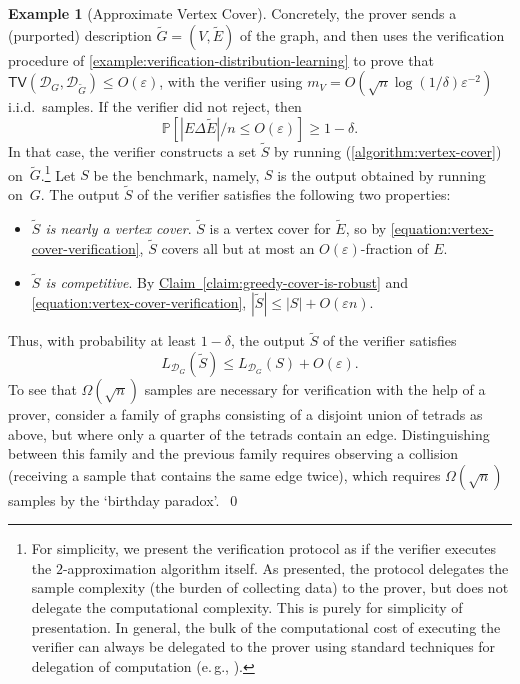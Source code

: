 \documentclass[11pt]{article}
\numberwithin{equation}{section}
\theoremstyle{definition}
\newtheorem{example}[theorem]{Example}
\theoremstyle{plain}
\newcommand{\eg}{e.\,g.}
\newcommand{\expref}[2]{\hyperref[#2]{#1~\ref{#2}}}
\theoremstyle{definition}\newtheorem{notation}[theorem]{Notation}\theoremstyle{plain}\raggedbottom
\newcommand{\roundBrackets}[1]{
	\mathopen{}\left(#1\right)\mathclose{}
}
\newcommand{\squareBrackets}[1]{
	\mathopen{}\left[#1\right]\mathclose{}
}
\newcommand{\customFunctionRound}[2]{
	#1\roundBrackets{#2}
}
\newcommand{\customFunctionSquare}[2]{
	#1\squareBrackets{#2}
}
\newcommand{\sfFunction}[2]{
	\customFunctionRound{\mathsf{#1}}{#2}
}
\newcommand{\bbFunction}[2]{
	\customFunctionSquare{\mathbb{#1}}{#2}
}
\newcommand{\OmegaOf}[1]{\Omega\roundBrackets{#1}}
\newcommand{\BigO}[1]{O\roundBrackets{#1}}
\newcommand{\PP}[1]{\bbFunction{P}{#1}}
\newcommand{\Loss}[2]{\LossNameEmpty_{#1}\roundBrackets{#2}}
\newcommand{\LossNameEmpty}{L}
\newcommand{\TV}[1]{\sfFunction{TV}{#1}}
\newcommand{\cD}{\mathcal{D}}
\newcommand{\1}{\mathds{1}}
\newcommand{\mV}{m_{\scriptscriptstyle V}}
\begin{document}
\begin{example}[Approximate Vertex Cover]
	Concretely, the prover sends a (purported) description $\widetilde{G} = (V, \widetilde{E})$ of the graph, and then uses the verification procedure of \cref{example:verification-distribution-learning} to prove that $\TV{\cD_G,\cD_{\widetilde{G}}} \leq \BigO{\varepsilon}$, with the verifier using $\mV = \BigO{\sqrt{n}\log(1/\delta)\varepsilon^{-2}}$ i.i.d.\ samples.
	If the verifier did not reject, then 
	\begin{equation}
		\label{equation:vertex-cover-verification}
		\PP{|E \Delta \widetilde{E}|/n \leq \BigO{\varepsilon}} \geq 1-\delta.
	\end{equation}
	In that case, the verifier constructs a set $\widetilde{S}$ by running  (\cref{algorithm:vertex-cover}) on~$\widetilde{G}$.\footnote{%
	  For simplicity, we present the verification protocol as if the verifier executes the $2$-approximation algorithm itself. As presented, the protocol delegates the sample complexity (the burden of collecting data) to the prover, but does not delegate the computational complexity. This is purely for simplicity of presentation. In general, the bulk of the computational %
cost  %
of executing the verifier can always be delegated to the prover using standard techniques for delegation of computation (\eg, \cite{DBLP:journals/jacm/GoldwasserKR15}).%
	}
	Let $S$ be the benchmark, namely, $S$ is the output obtained by running  on~$G$.
	The output $\widetilde{S}$ of the verifier satisfies the following two properties:
	\begin{itemize}
		\item{
			\emph{$\widetilde{S}$ is nearly a vertex cover}. $\widetilde{S}$ is a vertex cover for $\widetilde{E}$, so by \cref{equation:vertex-cover-verification}, $\widetilde{S}$ covers all but at most an $\BigO{\varepsilon}$-fraction of $E$.
		}
		\item{
			\emph{$\widetilde{S}$ is competitive}. By \expref{Claim}{claim:greedy-cover-is-robust} and \cref{equation:vertex-cover-verification}, $|\widetilde{S}| \leq |S| + \BigO{\varepsilon n}$.
		}
	\end{itemize}
	Thus, with probability at least $1-\delta$, the output $\widetilde{S}$ of the verifier satisfies
	\[
		\Loss{\cD_G}{\widetilde{S}} \leq \Loss{\cD_G}{S} + \BigO{\varepsilon}.
	\]
	To see that $\OmegaOf{\sqrt{n}}$ samples are necessary for verification with the help of a prover, consider a family of graphs consisting of a disjoint union of tetrads as above, but where only a quarter of the tetrads contain an edge. Distinguishing between this family and the previous family requires observing a collision (receiving a sample that contains the same edge twice), which requires $\OmegaOf{\sqrt{n}}$ samples by the `birthday paradox'.~\qed
\end{example}
\end{document}
